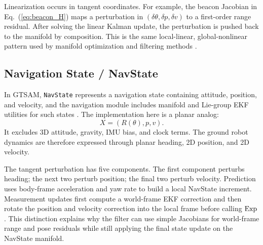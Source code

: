 Linearization occurs in tangent coordinates. For example, the beacon Jacobian in Eq.~(\ref{eq:beacon_H}) maps a perturbation in \((\delta\theta,\delta p,\delta v)\) to a first-order range residual. After solving the linear Kalman update, the perturbation is pushed back to the manifold by composition. This is the same local-linear, global-nonlinear pattern used by manifold optimization and filtering methods \citep{dellaertKaess2017factor,gtsamConcepts}.

\subsection{Navigation State / NavState}

In GTSAM, \texttt{NavState} represents a navigation state containing attitude, position, and velocity, and the navigation module includes manifold and Lie-group EKF utilities for such states \citep{gtsamNavigation,gtsamNavState}. The implementation here is a planar analog:
\[
    X=(R(\theta),p,v).
\]
It excludes 3D attitude, gravity, IMU bias, and clock terms. The ground robot dynamics are therefore expressed through planar heading, 2D position, and 2D velocity.

The tangent perturbation has five components. The first component perturbs heading; the next two perturb position; the final two perturb velocity. Prediction uses body-frame acceleration and yaw rate to build a local NavState increment. Measurement updates first compute a world-frame EKF correction and then rotate the position and velocity correction into the local frame before calling \(\operatorname{Exp}\). This distinction explains why the filter can use simple Jacobians for world-frame range and pose residuals while still applying the final state update on the NavState manifold.
